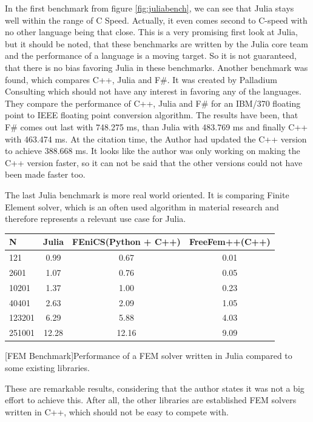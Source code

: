 In the first benchmark from figure \ref{fig:juliabench}, we can see that Julia stays well within the range of C Speed. 
Actually, it even comes second to C-speed with no other language being that close.
This is a very promising first look at Julia, but it should be noted, that these benchmarks are written by the Julia core team and the performance of a language is a moving target.
So it is not guaranteed, that there is no bias favoring Julia in these benchmarks.
Another benchmark was found, which compares C++, Julia and F\#. It was created by Palladium Consulting which should not have any interest in favoring any of the languages.
They compare the performance of C++, Julia and F\# for an IBM/370 floating point to IEEE floating point conversion algorithm.
The results\cite{JuliaFSCpp} have been, that F\# comes out last with 748.275 ms, than Julia with 483.769 ms and finally C++ with 463.474 ms. 
At the citation time, the Author had updated the C++ version to achieve 388.668 ms. 
It looks like the author was only working on making the C++ version faster, so it can not be said that the other versions could not have been made faster too.

The last Julia benchmark is more real world oriented. 
It is comparing Finite Element solver, which is an often used algorithm in material research and therefore represents a relevant use case for Julia.

\begin{table}[htbp]
    \centering
    \begin{tabular}{l|c|c|c}
        \hline
        \textbf{N}  & \textbf{Julia} & \textbf{FEniCS(Python + C++)}  & \textbf{FreeFem++(C++)}\\
        \hline
        121         & 0.99           & 0.67             & 0.01 \\
        2601        & 1.07           & 0.76             & 0.05 \\
        10201       & 1.37           & 1.00             & 0.23 \\
        40401       & 2.63           & 2.09             & 1.05 \\
        123201      & 6.29           & 5.88             & 4.03 \\
        251001      & 12.28          & 12.16            & 9.09 \\
        \hline
    \end{tabular}
    [FEM Benchmark]{Performance of a FEM solver written in Julia compared to some existing libraries. \cite{FMSolver}}
    \label{table:fembench}
\end{table}
These are remarkable results, considering that the author states it was not a big effort to achieve this. After all, the other libraries are established FEM solvers written in C++, which should not be easy to compete with.

